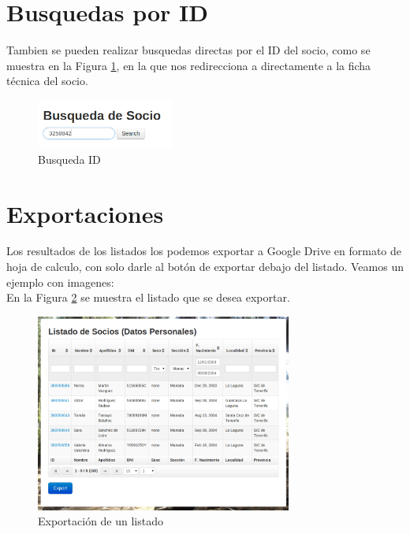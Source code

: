 \section{Busquedas por ID}
\label{3:sec5}

Tambien se pueden realizar busquedas directas por el ID del socio, como se muestra en la Figura \ref{fig:busqueda_id}, en la que nos redirecciona a directamente  a la ficha técnica del socio.\\

\begin{figure}[H]
\begin{center}
\includegraphics[width=0.40\textwidth]{images/busqueda_id.jpg}
\caption{Busqueda ID}
\label{fig:busqueda_id}
\end{center}
\end{figure}

\section{Exportaciones}
\label{3:sec6}

Los resultados de los listados los podemos exportar a Google Drive en formato de hoja de calculo, con solo darle al botón de exportar debajo del listado. Veamos un ejemplo con imagenes:\\

En la Figura \ref{fig:list_export} se muestra el listado que se desea exportar.
\begin{figure}[H]
\begin{center}
\includegraphics[width=0.75\textwidth]{images/listado_export.jpg}
\caption{Exportación de un listado}
\label{fig:list_export}
\end{center}
\end{figure}

